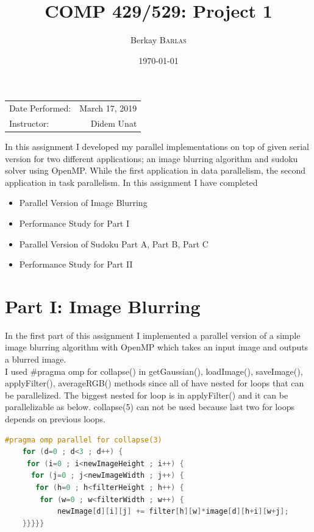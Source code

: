 \documentclass{article}
\title{COMP 429/529: Project 1} %
\author{Berkay \textsc{Barlas}} %
\date{\today} %
\newcommand\tab[1][0.5cm]{\hspace*{#1}}
\begin{document}
\maketitle %

\begin{center}
\begin{tabular}{l r}
Date Performed: & March 17, 2019 \\ %
Instructor: & Didem Unat %
\end{tabular}
\end{center}



\tab In this assignment I developed my parallel implementations 
on top of given serial version for two different applications;
an image blurring algorithm and sudoku solver using OpenMP. 
\newline While the first application in data parallelism, 
the second application in task parallelism. 
\newline
\newline
In this assignment I have completed
\begin{itemize}
    \item Parallel Version of Image Blurring
    \item Performance Study for Part I
    \item Parallel Version of Sudoku Part A, Part B, Part C
    \item Performance Study for Part II 
\end{itemize}


\section{Part I: Image Blurring}


\tab In the first part of this assignment I implemented 
a parallel version of a simple image blurring algorithm with
OpenMP which takes an input image and outputs a blurred image.
\\
\tab I used \#pragma omp for collapse() in getGaussian(), loadImage(), saveImage(), applyFilter(), averageRGB() 
methods since all of have nested for loops that can be parallelized. The biggest nested for loop is in applyFilter() 
and it can be parallelizable as below. collapse(5) can not be used because last two for loops depends on previous loops.
\begin{lstlisting}[language=C]
    #pragma omp parallel for collapse(3)
    for (d=0 ; d<3 ; d++) {
     for (i=0 ; i<newImageHeight ; i++) {
      for (j=0 ; j<newImageWidth ; j++) {
       for (h=0 ; h<filterHeight ; h++) {
        for (w=0 ; w<filterWidth ; w++) {
            newImage[d][i][j] += filter[h][w]*image[d][h+i][w+j];
    }}}}}
\end{lstlisting}
\end{document}
